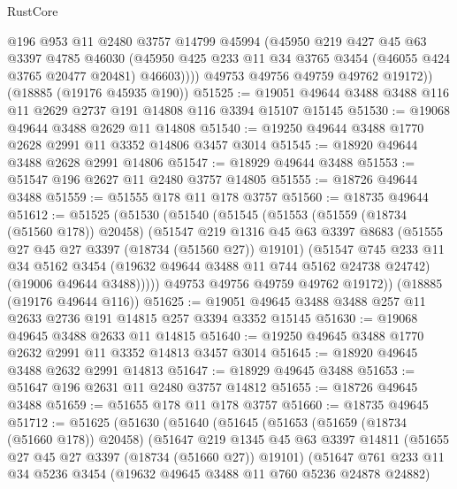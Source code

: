 \begin{lexlean}{RustCore}
\begin{coremodule}
            @196
            @953
            @11
            @2480
            @3757
            @14799
            @45994
            (@45950
              @219
              @427
              @45
              @63
              @3397
              @4785
              @46030
              (@45950 @425 @233 @11 @34 @3765 @3454 (@46055 @424 @3765 @20477 @20481) @46603))))
        @49753
        @49756
        @49759
        @49762
        @19172))
    (@18885 (@19176 @45935 @190))
@51525 := @19051 @49644 @3488 @3488 @116 @11 @2629 @2737 @191 @14808 @116 @3394 @15107 @15145
@51530 := @19068 @49644 @3488 @2629 @11 @14808
@51540 := @19250 @49644 @3488 @1770 @2628 @2991 @11 @3352 @14806 @3457 @3014
@51545 := @18920 @49644 @3488 @2628 @2991 @14806
@51547 := @18929 @49644 @3488
@51553 := @51547 @196 @2627 @11 @2480 @3757 @14805
@51555 := @18726 @49644 @3488
@51559 := @51555 @178 @11 @178 @3757
@51560 := @18735 @49644
@51612 := @51525
    (@51530
      (@51540
        (@51545
          (@51553
            (@51559 (@18734 (@51560 @178)) @20458)
            (@51547
              @219
              @1316
              @45
              @63
              @3397
              @8683
              (@51555 @27 @45 @27 @3397 (@18734 (@51560 @27)) @19101)
              (@51547
                @745
                @233
                @11
                @34
                @5162
                @3454
                (@19632 @49644 @3488 @11 @744 @5162 @24738 @24742)
                (@19006 @49644 @3488)))))
        @49753
        @49756
        @49759
        @49762
        @19172))
    (@18885 (@19176 @49644 @116))
@51625 := @19051 @49645 @3488 @3488 @257 @11 @2633 @2736 @191 @14815 @257 @3394 @3352 @15145
@51630 := @19068 @49645 @3488 @2633 @11 @14815
@51640 := @19250 @49645 @3488 @1770 @2632 @2991 @11 @3352 @14813 @3457 @3014
@51645 := @18920 @49645 @3488 @2632 @2991 @14813
@51647 := @18929 @49645 @3488
@51653 := @51647 @196 @2631 @11 @2480 @3757 @14812
@51655 := @18726 @49645 @3488
@51659 := @51655 @178 @11 @178 @3757
@51660 := @18735 @49645
@51712 := @51625
    (@51630
      (@51640
        (@51645
          (@51653
            (@51659 (@18734 (@51660 @178)) @20458)
            (@51647
              @219
              @1345
              @45
              @63
              @3397
              @14811
              (@51655 @27 @45 @27 @3397 (@18734 (@51660 @27)) @19101)
              (@51647
                @761
                @233
                @11
                @34
                @5236
                @3454
                (@19632 @49645 @3488 @11 @760 @5236 @24878 @24882)

\end{coremodule}
\end{lexlean}

